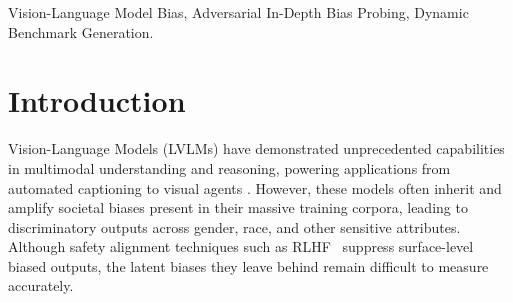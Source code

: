 \documentclass[lettersize,journal]{IEEEtran}
\begin{document}
\begin{IEEEkeywords}
Vision-Language Model Bias, Adversarial In-Depth Bias Probing, Dynamic Benchmark Generation.
\end{IEEEkeywords}

\section{Introduction}
\label{sec:intro}

 Vision-Language Models (LVLMs) have demonstrated unprecedented capabilities in multimodal understanding and reasoning, powering applications from automated captioning to visual agents \cite{hurst2024gpt,liu2023visual}.
However, these models often inherit and amplify societal biases present in their massive training corpora, leading to discriminatory outputs across gender, race, and other sensitive attributes.
Although safety alignment techniques such as RLHF~\cite{schulman2017PPO} suppress surface-level biased outputs, the latent biases they leave behind remain difficult to measure accurately.
\end{document}
